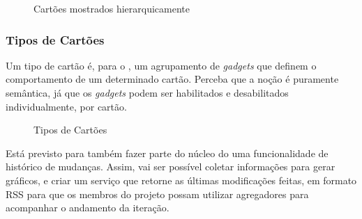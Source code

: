 \begin{figure}[H]
  \centering
  \caption{Cartões mostrados hierarquicamente}\label{figura:hierarquia}
\end{figure}

\subsubsection*{Tipos de Cartões}

Um tipo de cartão é, para o \calopsita{}, um agrupamento de \textit{gadgets} que definem o comportamento de um determinado cartão. Perceba que a noção é puramente semântica, já que os \textit{gadgets} podem ser habilitados e desabilitados individualmente, por cartão.

\begin{figure}[H]
  \centering
  \caption{Tipos de Cartões}\label{figura:tipo_cartao}
\end{figure}


Está previsto para também fazer parte do núcleo do \calopsita{} uma funcionalidade de histórico de mudanças. Assim, vai ser possível coletar informações para gerar gráficos, e criar um serviço que retorne as últimas modificações feitas, em formato RSS para que os membros do projeto possam utilizar agregadores para acompanhar o andamento da iteração.

